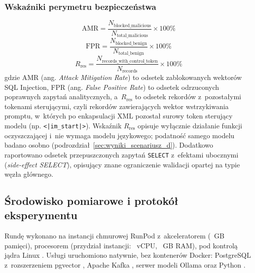 \subsubsection{Wskaźniki perymetru bezpieczeństwa}
\begin{equation}
\text{AMR} = \frac{N_{\text{blocked\_malicious}}}{N_{\text{total\_malicious}}} \times 100\%
\label{eq:amr_metric}
\end{equation}
\begin{equation}
\text{FPR} = \frac{N_{\text{blocked\_benign}}}{N_{\text{total\_benign}}} \times 100\%
\label{eq:fpr_metric}
\end{equation}
\begin{equation}
R_{\text{res}} = \frac{N_{\text{records\_with\_control\_token}}}{N_{\text{records}}} \times 100\%
\label{eq:asr_metric}
\end{equation}
gdzie AMR (ang. \emph{Attack Mitigation Rate}) to odsetek zablokowanych wektorów SQL Injection, FPR (ang. \emph{False Positive Rate}) to odsetek odrzuconych poprawnych zapytań analitycznych, a~$R_{\text{res}}$ to odsetek rekordów z~pozostałymi tokenami sterującymi, czyli rekordów zawierających wektor wstrzykiwania promptu, w~których po enkapsulacji XML pozostał surowy token sterujący modelu (np. \texttt{<|im\_start|>}). Wskaźnik $R_{\text{res}}$ opisuje wyłącznie działanie funkcji oczyszczającej i~nie wymaga modelu językowego; podatność samego modelu badano osobno (podrozdział~\ref{sec:wyniki_scenariusz_d}). Dodatkowo raportowano odsetek przepuszczonych zapytań \texttt{SELECT} z~efektami ubocznymi (\emph{side-effect SELECT}), opisujący znane ograniczenie walidacji opartej na typie węzła głównego.

\subsection{Środowisko pomiarowe i protokół eksperymentu}
\label{subsec:wyniki_powtarzalnosc}

Rundę wykonano na instancji chmurowej RunPod z~akceleratorem \wynGpu{} (\wynGpuMem~GB pamięci), procesorem \wynCpu{} (przydział instancji: \wynVcpu~vCPU, \wynRam~GB RAM), pod kontrolą jądra Linux \wynKernel. Usługi uruchomiono natywnie, bez kontenerów Docker: PostgreSQL \wynPg{} z~rozszerzeniem pgvector \wynPgvector, Apache Kafka \wynKafka, serwer modeli Ollama \wynOllama{} oraz Python \wynPython.

